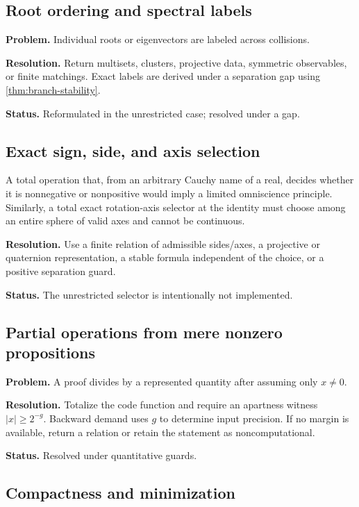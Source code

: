 \subsection{Root ordering and spectral labels}

\textbf{Problem.} Individual roots or eigenvectors are labeled across collisions.

\textbf{Resolution.} Return multisets, clusters, projective data, symmetric observables, or finite matchings.  Exact labels are derived under a separation gap using \cref{thm:branch-stability}.

\textbf{Status.} Reformulated in the unrestricted case; resolved under a gap.

\subsection{Exact sign, side, and axis selection}

\begin{barrier}
A total operation that, from an arbitrary Cauchy name of a real, decides whether it is nonnegative or nonpositive would imply a limited omniscience principle.  Similarly, a total exact rotation-axis selector at the identity must choose among an entire sphere of valid axes and cannot be continuous.
\end{barrier}

\textbf{Resolution.} Use a finite relation of admissible sides/axes, a projective or quaternion representation, a stable formula independent of the choice, or a positive separation guard.

\textbf{Status.} The unrestricted selector is intentionally not implemented.

\subsection{Partial operations from mere nonzero propositions}

\textbf{Problem.} A proof divides by a represented quantity after assuming only \(x\ne0\).

\textbf{Resolution.} Totalize the code function and require an apartness witness \(|x|\ge2^{-g}\).  Backward demand uses \(g\) to determine input precision.  If no margin is available, return a relation or retain the statement as noncomputational.

\textbf{Status.} Resolved under quantitative guards.

\subsection{Compactness and minimization}

